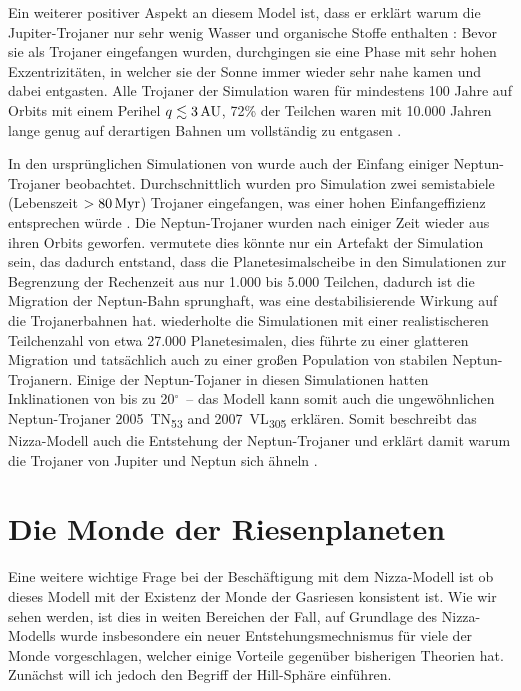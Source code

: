 \documentclass[12pt,a4paper,twoside,open=right,bibliography=totoc]{scrbook}
\renewcommand{\cite}{ \citep}
\newcommand{\degree}{$^\circ$}
\begin{document}
Ein weiterer positiver Aspekt an diesem Model ist, dass er erklärt warum die Jupiter-Trojaner nur sehr wenig Wasser und organische Stoffe enthalten\cite{Emery2004}:
Bevor sie als Trojaner eingefangen wurden, durchgingen sie eine Phase mit sehr hohen Exzentrizitäten, in welcher sie der Sonne immer wieder sehr nahe kamen und dabei entgasten.
Alle Trojaner der Simulation waren für mindestens 100 Jahre auf Orbits mit einem Perihel $q\lesssim \unit[3]{AU}$, 72\% der Teilchen waren mit 10.000 Jahren lange genug auf derartigen Bahnen um vollständig zu entgasen\cite{Levison1997,Morbidelli2005}.

In den ursprünglichen Simulationen von \cite{Tsiganis2005} wurde auch der Einfang einiger Neptun-Trojaner beobachtet. Durchschnittlich wurden pro Simulation zwei semistabiele (Lebenszeit $>\unit[80]{Myr}$) Trojaner eingefangen, was einer hohen Einfangeffizienz entsprechen würde\cite{Tsiganis2005}.
Die Neptun-Trojaner wurden nach einiger Zeit wieder aus ihren Orbits geworfen.
\cite{Tsiganis2005} vermutete dies könnte nur ein Artefakt der Simulation sein, das dadurch entstand, dass die Planetesimalscheibe in den Simulationen zur Begrenzung der Rechenzeit aus nur 1.000 bis 5.000 Teilchen, dadurch ist die Migration der Neptun-Bahn sprunghaft, was eine destabilisierende Wirkung auf die Trojanerbahnen hat.
\cite{Nesvorny2009} wiederholte die Simulationen mit einer realistischeren Teilchenzahl von etwa 27.000 Planetesimalen, dies führte zu einer glatteren Migration und tatsächlich auch zu einer großen Population von stabilen Neptun-Trojanern.
Einige der Neptun-Tojaner in diesen Simulationen hatten Inklinationen von bis zu 20\degree\ -- das Modell kann somit auch die ungewöhnlichen Neptun-Trojaner 2005~TN\textsubscript{53} and 2007~VL\textsubscript{305} erklären. 
Somit beschreibt das Nizza-Modell auch die Entstehung der Neptun-Trojaner und erklärt damit warum die Trojaner von Jupiter und Neptun sich ähneln\cite{Nesvorny2009}.

\FloatBarrier
\section{Die Monde der Riesenplaneten}\label{Monde}
Eine weitere wichtige Frage bei der Beschäftigung mit dem Nizza-Modell ist ob dieses Modell mit der Existenz der Monde der Gasriesen konsistent ist.
Wie wir sehen werden, ist dies in weiten Bereichen der Fall, auf Grundlage des Nizza-Modells wurde insbesondere ein neuer Entstehungsmechnismus für viele der Monde vorgeschlagen, welcher einige Vorteile gegenüber bisherigen Theorien hat. Zunächst will ich jedoch den Begriff der Hill-Sphäre einführen.
\end{document}
